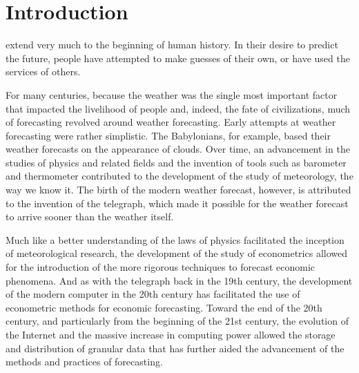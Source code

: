 \documentclass{tufte-book}
\title[Educated Guess]{
	\usebox{\titleimage}
	\vspace{-0.9in}
	
	\setlength{\parindent}{60pt}%
	\LARGE\bfseries
	An Intuitive Guide to Forecasting \\
	With Time Series Models Using R}
\author{David Ubilava}
\date{October 2022}
\begin{document}
	
	\frontmatter
	
	\maketitle
	
	\tableofcontents
	
	\listoffigures
	
	\listoftables
	
	
	\mainmatter
	
	\chapter{Introduction}
	\label{c1}
	
	 extend very much to the beginning of human history. In their desire to predict the future, people have attempted to make guesses of their own, or have used the services of others. 
	
	For many centuries, because the weather was the single most important factor that impacted the livelihood of people and, indeed, the fate of civilizations, much of forecasting revolved around weather forecasting. Early attempts at weather forecasting were rather simplistic. The Babylonians, for example, based their weather forecasts on the appearance of clouds. Over time, an advancement in the studies of physics and related fields and the invention of tools such as barometer and thermometer contributed to the development of the study of meteorology, the way we know it. The birth of the modern weather forecast, however, is attributed to the invention of the telegraph, which made it possible for the weather forecast to arrive sooner than the weather itself. 
	
	Much like a better understanding of the laws of physics facilitated the inception of meteorological research, the development of the study of econometrics allowed for the introduction of the more rigorous techniques to forecast economic phenomena. And as with the telegraph back in the 19th century, the development of the modern computer in the 20th century has facilitated the use of econometric methods for economic forecasting. Toward the end of the 20th century, and particularly from the beginning of the 21st century, the evolution of the Internet and the massive increase in computing power allowed the storage and distribution of granular data that has further aided the advancement of the methods and practices of forecasting. 
	
\end{document}

